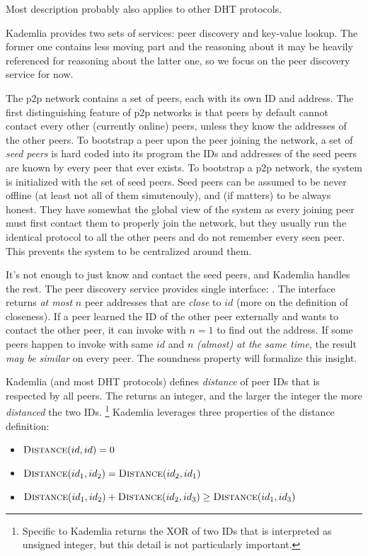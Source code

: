 {\tiny Most description probably also applies to other DHT protocols.}

Kademlia provides two sets of services: peer discovery and key-value lookup.
The former one contains less moving part and the reasoning about it may be heavily referenced for reasoning about the latter one, so we focus on the peer discovery service for now.

The p2p network contains a set of peers, each with its own ID and address.
The first distinguishing feature of p2p networks is that peers by default cannot contact every other (currently online) peers, unless they know the addresses of the other peers.
To bootstrap a peer \ie upon the peer joining the network, a set of \emph{seed peers} is hard coded into its program \ie the IDs and addresses of the seed peers are known by every peer that ever exists.
To bootstrap a p2p network, the system is initialized with the set of seed peers.
Seed peers can be assumed to be never offline (at least not all of them simutenouly), and (if matters) to be always honest.
They have somewhat the global view of the system as every joining peer must first contact them to properly join the network, but they usually run the identical protocol to all the other peers and \eg do not remember every seen peer.
This prevents the system to be centralized around them.

It's not enough to just know and contact the seed peers, and Kademlia handles the rest.
The peer discovery service provides single interface: \find[$id$, $n$].
The interface returns \emph{at most} $n$ peer addresses that are \emph{close} to $id$ (more on the definition of closeness).
If a peer learned the ID of the other peer externally and wants to contact the other peer, it can invoke \find with $n = 1$ to find out the address.
If some peers happen to invoke \find with same $id$ and $n$ \emph{(almost) at the same time}, the result \emph{may be similar} on every peer.
The soundness property will formalize this insight.

Kademlia (and most DHT protocols) defines \emph{distance} of peer IDs that is respected by all peers.
The \dist[$id_1$, $id_2$] returns an integer, and the larger the integer the more \emph{distanced} the two IDs.
\footnote{Specific to Kademlia \dist returns the XOR of two IDs that is interpreted as unsigned integer, but this detail is not particularly important.}
Kademlia leverages three properties of the distance definition:
\begin{itemize}
    \item $\dist[id, id] = 0$
    \item $\dist[id_1, id_2] = \dist[id_2, id_1]$
    \item $\dist[id_1, id_2] + \dist[id_2, id_3] \geq \dist[id_1, id_3]$
\end{itemize}

